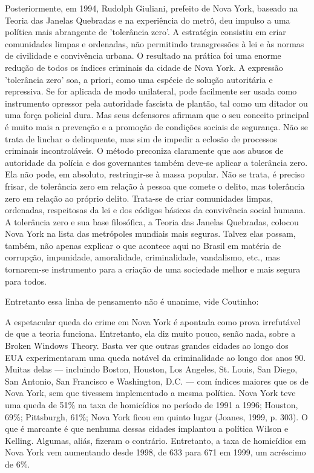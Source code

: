 \documentclass[
	12pt,				%
	openright,			%
	twoside,			%
	a4paper,			%
	chapter=TITLE,		%
	section=TITLE,		%
	subsection=TITLE,	%
	subsubsection=TITLE,%
	spanish,            %
	english,			%
	brazil				%
	]{abntex2}
\begin{document}
\begin{citacao}
Posteriormente, em 1994, Rudolph Giuliani, prefeito de Nova York, baseado na Teoria das Janelas
Quebradas e na experiência do metrô, deu impulso a uma política mais abrangente de 'tolerância zero'. A
estratégia consistiu em criar comunidades limpas e ordenadas, não permitindo transgressões à lei e às normas de civilidade e convivência urbana. O resultado na prática foi uma enorme redução de todos os índices criminais da cidade de Nova York.
A expressão 'tolerância zero' soa, a priori, como uma espécie de solução autoritária e repressiva. Se for
aplicada de modo unilateral, pode facilmente ser usada como instrumento opressor pela autoridade fascista
de plantão, tal como um ditador ou uma força policial dura. Mas seus defensores afirmam que o seu
conceito principal é muito mais a prevenção e a promoção de condições sociais de segurança. Não se trata
de linchar o delinquente, mas sim de impedir a eclosão de processos criminais incontroláveis. O método
preconiza claramente que aos abusos de autoridade da polícia e dos governantes também deve-se aplicar a
tolerância zero. Ela não pode, em absoluto, restringir-se à massa popular. Não se trata, é preciso
frisar, de tolerância zero em relação à pessoa que comete o delito, mas tolerância zero em relação ao
próprio delito. Trata-se de criar comunidades limpas, ordenadas, respeitosas da lei e dos códigos básicos
da convivência social humana.
A tolerância zero e sua base filosófica, a Teoria das Janelas Quebradas, colocou Nova York na lista das
metrópoles mundiais mais seguras. Talvez elas possam, também, não apenas explicar o que acontece aqui no
Brasil em matéria de corrupção, impunidade, amoralidade, criminalidade, vandalismo, etc., mas tornarem-se
instrumento para a criação de uma sociedade melhor e mais segura para todos.\cite{Pelegrini}
\end{citacao}
\par
Entretanto essa linha de pensamento não é unanime, vide Coutinho:
\begin{citacao}
A espetacular queda do crime em Nova York é apontada como prova irrefutável de que a teoria funciona.
Entretanto, ela diz muito pouco, senão nada, sobre a Broken Windows Theory. Basta ver que outras grandes
cidades ao longo dos EUA experimentaram uma queda notável da criminalidade ao longo dos anos 90. Muitas
delas — incluindo Boston, Houston, Los Angeles, St. Louis, San Diego, San Antonio, San Francisco e
Washington, D.C. — com índices maiores que os de Nova York, sem que tivessem implementado a mesma
política. Nova York teve uma queda de 51\% na taxa de homicídios no período de 1991 a 1996; Houston, 69\%;
Pittsburgh, 61\%; Nova York ficou em quinto lugar (Joanes, 1999, p. 303). O que é marcante é que nenhuma
dessas cidades implantou a política Wilson e Kelling. Algumas, aliás, fizeram o contrário.
Entretanto, a taxa de homicídios em Nova York vem aumentando desde 1998, de 633 para 671 em 1999, um
acréscimo de 6\%.\cite{Coutinho}
\end{citacao}
\end{document}
